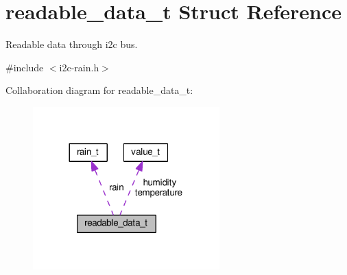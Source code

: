 \hypertarget{structreadable__data__t}{}\section{readable\+\_\+data\+\_\+t Struct Reference}
\label{structreadable__data__t}


Readable data through i2c bus.  




{\ttfamily \#include $<$i2c-\/rain.\+h$>$}



Collaboration diagram for readable\+\_\+data\+\_\+t\+:
\nopagebreak
\begin{figure}[H]
\begin{center}
\leavevmode
\includegraphics[width=204pt]{structreadable__data__t__coll__graph}
\end{center}
\end{figure}
